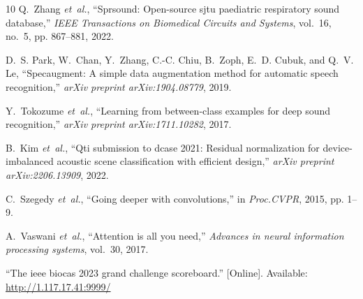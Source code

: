 \documentclass[conference]{IEEEtran}
\begin{document}
\begin{thebibliography}{10}
Q.~Zhang \emph{et~al.}, ``Sprsound: Open-source sjtu paediatric respiratory
  sound database,'' \emph{IEEE Transactions on Biomedical Circuits and
  Systems}, vol.~16, no.~5, pp. 867--881, 2022.

D.~S. Park, W.~Chan, Y.~Zhang, C.-C. Chiu, B.~Zoph, E.~D. Cubuk, and Q.~V. Le,
  ``Specaugment: A simple data augmentation method for automatic speech
  recognition,'' \emph{arXiv preprint arXiv:1904.08779}, 2019.

Y.~Tokozume \emph{et~al.}, ``Learning from between-class examples for deep
  sound recognition,'' \emph{arXiv preprint arXiv:1711.10282}, 2017.

B.~Kim \emph{et~al.}, ``Qti submission to dcase 2021: Residual normalization
  for device-imbalanced acoustic scene classification with efficient design,''
  \emph{arXiv preprint arXiv:2206.13909}, 2022.

C.~Szegedy \emph{et~al.}, ``Going deeper with convolutions,'' in
  \emph{Proc.CVPR}, 2015, pp. 1--9.

A.~Vaswani \emph{et~al.}, ``Attention is all you need,'' \emph{Advances in
  neural information processing systems}, vol.~30, 2017.

\BIBentryALTinterwordspacing
``The ieee biocas 2023 grand challenge scoreboard.'' [Online]. Available:
  \url{http://1.117.17.41:9999/}
\BIBentrySTDinterwordspacing

\end{thebibliography}
\end{document}
